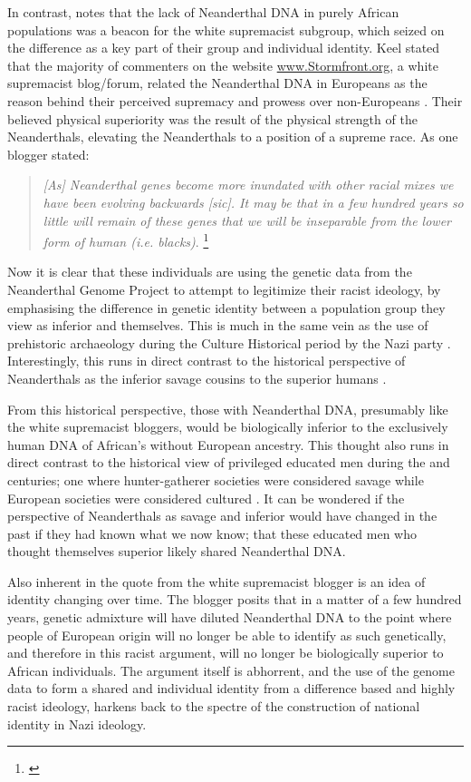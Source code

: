 In contrast, \textcite{Keel_2010} notes that the lack of Neanderthal DNA in purely African populations was a beacon for the white supremacist subgroup, which seized on the difference as a key part of their group and individual identity. Keel stated that the majority of commenters on the website \url{www.Stormfront.org}, a white supremacist blog/forum, related the Neanderthal DNA in Europeans as the reason behind their perceived supremacy and prowess over non-Europeans \parencite{Keel_2010}. Their believed physical superiority was the result of the physical strength of the Neanderthals, elevating the Neanderthals to a position of a supreme race. 
As one blogger stated:

\blockquote{\textit{[As] Neanderthal genes become more inundated with other racial mixes we have been evolving backwards [sic]. It may be that in a few hundred years so little will remain of these genes that we will be inseparable from the lower form of human (i.e. blacks)}.
	\footnote{\textcite{Keel_2010}}}
Now it is clear that these individuals are using the genetic data from the Neanderthal Genome Project to attempt to legitimize their racist ideology, by emphasising the difference in genetic identity between a population group they view as inferior and themselves. This is much in the same vein as the use of prehistoric archaeology during the Culture Historical period by the Nazi party \parencite{Arnold_1992}. Interestingly, this runs in direct contrast to the historical perspective of Neanderthals as the inferior savage cousins to the superior humans \parencite{King_1864}. 

From this historical perspective, those with Neanderthal DNA, presumably like the white supremacist bloggers, would be biologically inferior to the exclusively human DNA of African's without European ancestry. This thought also runs in direct contrast to the historical view of privileged educated men during the  and  centuries; one where hunter-gatherer societies were considered savage while European societies were considered cultured \parencite{Ellingson_2001}. It can be wondered if the perspective of Neanderthals as savage and inferior would have changed in the past if they had known what we now know; that these educated men who thought themselves superior likely shared Neanderthal DNA.

Also inherent in the quote from the white supremacist blogger is an idea of identity changing over time. The blogger posits that in a matter of a few hundred years, genetic admixture will have diluted Neanderthal DNA to the point where people of European origin will no longer be able to identify as such genetically, and therefore in this racist argument, will no longer be biologically superior to African individuals. The argument itself is abhorrent, and the use of the genome data to form a shared and individual identity from a difference based and highly racist ideology, harkens back to the spectre of the construction of national identity in Nazi ideology. 

